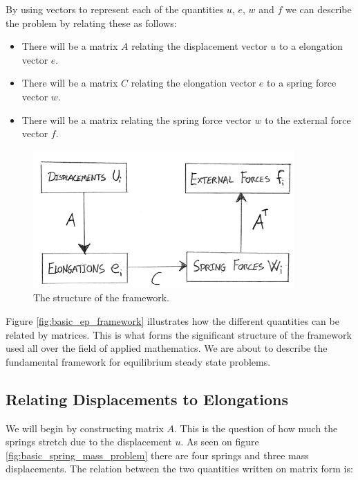 
By using vectors to represent each of the quantities $u$, $e$, $w$ and
$f$ we can describe the problem by relating these as follows:

\begin{itemize}
\item There will be a matrix $A$ relating the displacement vector
$u$ to a elongation vector $e$.
\item There will be a matrix $C$ relating the elongation vector $e$
  to a spring force vector $w$.
\item There will be a matrix relating the spring force vector $w$ to the
  external force vector $f$. %
\end{itemize}

\begin{figure}
  \centering
  \includegraphics[width=10cm]{./images/equilibrium_framework_basic_ep_framework.png}
\caption{The structure of the framework.}
\label{fig:basic_ep_framework}
\end{figure}

Figure \vref{fig:basic_ep_framework} illustrates how the different
quantities can be related by matrices. This is what forms the significant structure
of the framework used all over the field of applied mathematics. We
are about to describe the fundamental framework for
equilibrium steady state problems. \\

\subsection{Relating Displacements to Elongations}
We will begin by constructing matrix $A$. This is the question of
how much the springs stretch due to the displacement $u$. As seen
on figure \vref{fig:basic_spring_mass_problem} there are four springs
and three mass displacements. The relation between the two quantities
written on matrix form is:

